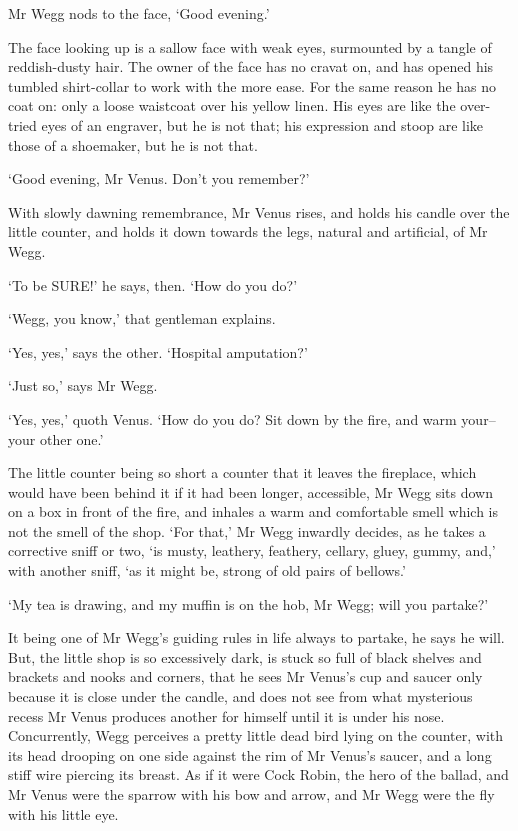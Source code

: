 Mr Wegg nods to the face, ‘Good evening.’

The face looking up is a sallow face with weak eyes, surmounted by a
tangle of reddish-dusty hair. The owner of the face has no cravat on,
and has opened his tumbled shirt-collar to work with the more ease.
For the same reason he has no coat on: only a loose waistcoat over his
yellow linen. His eyes are like the over-tried eyes of an engraver, but
he is not that; his expression and stoop are like those of a shoemaker,
but he is not that.

‘Good evening, Mr Venus. Don’t you remember?’

With slowly dawning remembrance, Mr Venus rises, and holds his candle
over the little counter, and holds it down towards the legs, natural and
artificial, of Mr Wegg.

‘To be SURE!’ he says, then. ‘How do you do?’

‘Wegg, you know,’ that gentleman explains.

‘Yes, yes,’ says the other. ‘Hospital amputation?’

‘Just so,’ says Mr Wegg.

‘Yes, yes,’ quoth Venus. ‘How do you do? Sit down by the fire, and warm
your--your other one.’

The little counter being so short a counter that it leaves the
fireplace, which would have been behind it if it had been longer,
accessible, Mr Wegg sits down on a box in front of the fire, and inhales
a warm and comfortable smell which is not the smell of the shop. ‘For
that,’ Mr Wegg inwardly decides, as he takes a corrective sniff or two,
‘is musty, leathery, feathery, cellary, gluey, gummy, and,’ with another
sniff, ‘as it might be, strong of old pairs of bellows.’

‘My tea is drawing, and my muffin is on the hob, Mr Wegg; will you
partake?’

It being one of Mr Wegg’s guiding rules in life always to partake, he
says he will. But, the little shop is so excessively dark, is stuck so
full of black shelves and brackets and nooks and corners, that he sees
Mr Venus’s cup and saucer only because it is close under the candle, and
does not see from what mysterious recess Mr Venus produces another
for himself until it is under his nose. Concurrently, Wegg perceives a
pretty little dead bird lying on the counter, with its head drooping
on one side against the rim of Mr Venus’s saucer, and a long stiff wire
piercing its breast. As if it were Cock Robin, the hero of the ballad,
and Mr Venus were the sparrow with his bow and arrow, and Mr Wegg were
the fly with his little eye.

